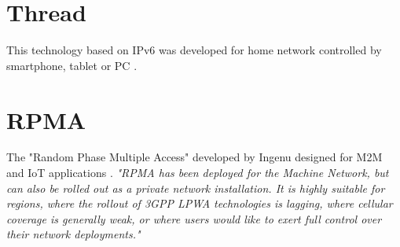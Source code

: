 \section{Thread}
This technology based on IPv6 was developed for home network controlled by smartphone, tablet or PC \cite{29} \cite{30} \cite{31}.


\section{RPMA}
The "Random Phase Multiple Access" developed by Ingenu designed for M2M and IoT applications \cite{32} \cite{rpma_ublox} \cite{34}. \textit{"RPMA has been deployed for the Machine Network, but can also be rolled out as a private network installation. It is highly suitable for regions, where the rollout of 3GPP LPWA technologies is lagging, where cellular coverage is generally weak, or where users would like to exert full control over their network deployments."}\cite{rpma_ublox}


